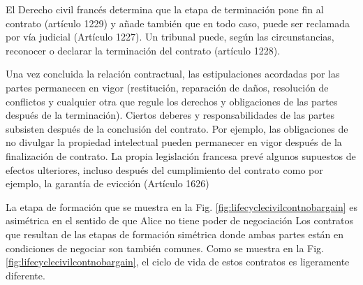 \documentclass[12pt]{report} %
\begin{document}
El Derecho civil francés determina que la etapa de terminación pone fin al contrato (artículo 1229) y añade también que en todo caso, puede ser reclamada por vía judicial (Artículo 1227). Un tribunal puede, según las circunstancias, reconocer o declarar la terminación del contrato (artículo 1228). 

Una vez concluida la relación contractual, las estipulaciones acordadas por las partes permanecen en vigor (restitución, reparación de daños, resolución de conflictos y cualquier otra que regule los derechos y obligaciones de las partes después de la terminación). Ciertos deberes y responsabilidades de las partes subsisten después de la conclusión del contrato. Por ejemplo, las obligaciones de no divulgar la propiedad intelectual pueden permanecer en vigor después de la finalización de contrato. La propia legislación francesa prevé algunos supuestos de efectos ulteriores, incluso después del cumplimiento del contrato como por ejemplo, la garantía de evicción (Artículo 1626)

La etapa de formación que se muestra en la Fig. \ref{fig:lifecyclecivilcontnobargain} es asimétrica en el sentido de que Alice no tiene poder de negociación Los contratos que resultan de las etapas de formación simétrica donde ambas partes están en condiciones de negociar son también comunes. Como se muestra en la Fig.\ref{fig:lifecyclecivilcontnobargain}, el ciclo de vida de estos contratos es ligeramente diferente. 
\end{document}
